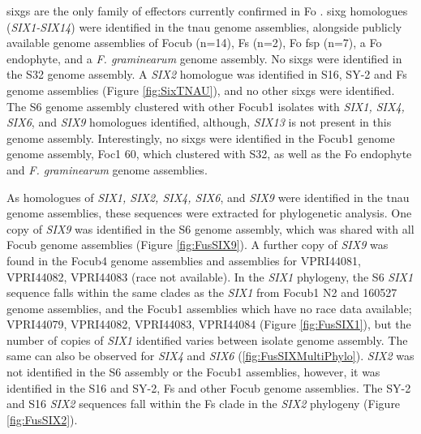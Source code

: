 \Acp{sixg} are the only family of effectors currently confirmed in \ac{Fo} \parencite{Armitage2018, Czislowski2018}. \Ac{sixg} homologues (\textit{SIX1-SIX14}) were identified in the \ac{tnau} genome assemblies, alongside publicly available genome assemblies of \ac{Focub} (n=14), \ac{Fs} (n=2), \ac{Fo} \ac{fsp} (n=7), a \ac{Fo} endophyte, and a \textit{F. graminearum} genome assembly. No \acp{sixg} were identified in the S32 genome assembly. A \textit{SIX2} homologue was identified in S16,  SY-2  and  \ac{Fs} genome assemblies (Figure \ref{fig:SixTNAU}), and no other \acp{sixg} were identified. The S6 genome assembly clustered with other \ac{Focub1} isolates with \textit{SIX1, SIX4, SIX6}, and \textit{SIX9} homologues identified, although, \textit{SIX13} is not present in this genome assembly. Interestingly, no \acp{sixg} were identified in the \ac{Focub1} genome genome assembly, Foc1 60, which clustered with S32, as well as the \ac{Fo} endophyte and \textit{F. graminearum} genome assemblies. 

As homologues of \textit{SIX1, SIX2, SIX4, SIX6}, and \textit{SIX9} were identified in the \ac{tnau} genome assemblies, these sequences were extracted for phylogenetic analysis.  One copy of \textit{SIX9} was identified in the S6 genome assembly, which was shared with all \ac{Focub} genome assemblies (Figure \ref{fig:FusSIX9}). A further copy of \textit{SIX9} was found in the \ac{Focub4} genome assemblies and assemblies for VPRI44081, VPRI44082, VPRI44083 (race not available). In the \textit{SIX1} phylogeny, the S6 \textit{SIX1} sequence falls within the same clades as the \textit{SIX1} from \ac{Focub1} N2 and 160527 genome assemblies, and the \ac{Focub1} assemblies which have no race data available; VPRI44079, VPRI44082, VPRI44083, VPRI44084 (Figure \ref{fig:FusSIX1}), but the number of copies of \textit{SIX1} identified varies between isolate genome assembly. The same can also be observed for \textit{SIX4} and \textit{SIX6} (\ref{fig:FusSIXMultiPhylo}). \textit{SIX2} was not identified in the S6 assembly or the \ac{Focub1} assemblies, however, it was identified in the S16 and SY-2, \ac{Fs} and other \ac{Focub} genome assemblies. The SY-2 and S16 \textit{SIX2} sequences fall within the \ac{Fs} clade in the \textit{SIX2} phylogeny (Figure \ref{fig:FusSIX2}).

